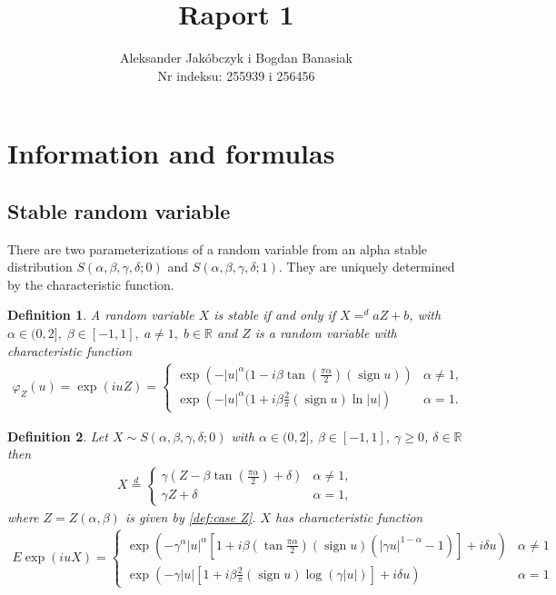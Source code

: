 \documentclass{article}
\title{Raport 1}
\author{Aleksander Jakóbczyk i Bogdan Banasiak\\ 
	Nr indeksu: 255939 i 256456}
\date{}\date{}
\newtheorem{definition}{Definition}
\DeclareMathOperator{\sign}{sign}
\begin{document}
	
	\maketitle
	\section{Information and formulas}
		\subsection*{Stable random variable}
		There are two parameterizations of a random variable from an alpha stable distribution $S(\alpha, \beta , \gamma, \delta; 0)$ and $S(\alpha, \beta , \gamma, \delta; 1)$.
		They are uniquely determined by the characteristic function.
		\begin{definition} A random variable $X$ is stable if and only if $X=^d aZ +b$, with \\$\alpha \in (0,2],\;\beta\in [-1,1],\; a\ne1,\; b\in\mathbb{R}$ and $Z$ is a random variable with characteristic function  
			\begin{gather*}
				\varphi_Z(u) = \exp(i u Z) =
				\begin{cases}\label{def:case Z}
					\exp\left(- |u|^\alpha(1-i\beta\tan(\frac{\pi\alpha}{2})(\sign u)  \right) &\alpha \ne 1,\\
					\exp\left(- |u|^\alpha(1+i\beta\frac{2}{\pi}(\sign u)\ln|u|  \right) &\alpha = 1.
				\end{cases}
			\end{gather*}
		\end{definition}
		\begin{definition} Let $X \sim S(\alpha, \beta , \gamma, \delta; 0)$ with $\alpha \in (0,2]$, $\beta \in [-1,1]$, $\gamma \ge 0$, $\delta\in\mathbb{R}$ then  
			\begin{gather*}
				X \stackrel{d}{=} 
				\begin{cases}
					\gamma (Z- \beta\tan(\frac{\pi\alpha}{2})+\delta)& \alpha\ne1,\\
					\gamma Z + \delta& \alpha=1,
				\end{cases}
			\end{gather*}
			where $Z = Z(\alpha,\beta)$ is given by \ref{def:case Z}. $X$ has characteristic function
			\begin{gather*}
				E \exp (i u X)= \begin{cases}
					\exp \left(-\gamma^\alpha|u|^\alpha\left[1+i \beta\left(\tan \frac{\pi \alpha}{2}\right)(\operatorname{sign} u)\left(|\gamma u|^{1-\alpha}-1\right)\right]+i \delta u\right) & \alpha \neq 1 \\ \exp \left(-\gamma|u|\left[1+i \beta \frac{2}{\pi}(\operatorname{sign} u) \log (\gamma|u|)\right]+i \delta u\right) & \alpha=1
				\end{cases}
			\end{gather*}
		\end{definition}
\end{document}
